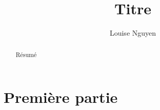\documentclass[headings=standardclasses]{scrartcl}
\title{Titre}
\author{Louise Nguyen}
\date{}
\theoremstyle{definition}
\theoremstyle{remark}
\begin{document}
\maketitle
\begin{abstract}
    Résumé
\end{abstract}

\section{Première partie}
\end{document}
